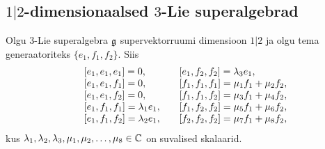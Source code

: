 
\subsection{\texorpdfstring{$1|2$}{1|2}-dimensionaalsed
    \texorpdfstring{$3$}{3}-Lie superalgebrad}

Olgu $3$-Lie superalgebra $\mathfrak{g}$ supervektorruumi dimensioon
$1|2$ ja olgu tema generaatoriteks $\{ e_1, f_1, f_2 \}$. Siis
\begin{align*}
    \begin{matrix*}[l]
        & [e_1, e_1, e_1] = 0, \quad
        & [e_1, f_2, f_2] = \l_3 e_1, \\
        & [e_1, e_1, f_1] = 0, \quad
        & [f_1, f_1, f_1] = \m_1 f_1 + \m_2 f_2, \\
        & [e_1, e_1, f_2] = 0, \quad
        & [f_1, f_1, f_2] = \m_3 f_1 + \m_4 f_2, \\
        & [e_1, f_1, f_1] = \l_1 e_1, \quad
        & [f_1, f_2, f_2] = \m_5 f_1 + \m_6 f_2, \\
        & [e_1, f_1, f_2] = \l_2 e_1, \quad
        & [f_2, f_2, f_2] = \m_7 f_1 + \m_8 f_2,
    \end{matrix*}
\end{align*}
kus $\lambda_1, \lambda_2, \lambda_3, \mu_1, \mu_2, \dots, \mu_8 \in \mathbb{C}$ on suvalised skalaarid.


